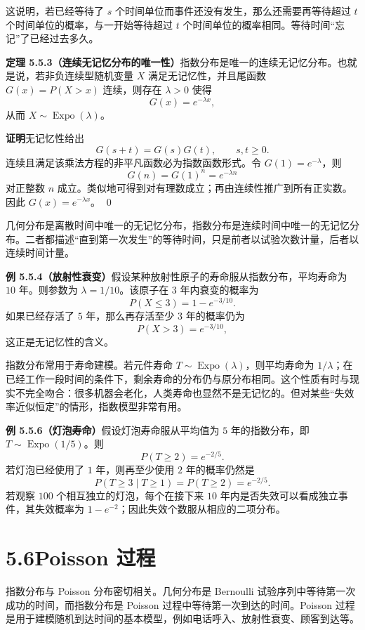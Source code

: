 \documentclass[UTF8, 12pt, fontset=fandol, oneside]{ctexart}
\begin{document}
这说明，若已经等待了 $s$ 个时间单位而事件还没有发生，那么还需要再等待超过 $t$ 个时间单位的概率，与一开始等待超过 $t$ 个时间单位的概率相同。等待时间“忘记”了已经过去多久。

\noindent\textbf{定理 5.5.3（连续无记忆分布的唯一性）}\quad 指数分布是唯一的连续无记忆分布。也就是说，若非负连续型随机变量 $X$ 满足无记忆性，并且尾函数 $G(x)=P(X>x)$ 连续，则存在 $\lambda>0$ 使得
\[
  G(x)=e^{-\lambda x},
\]
从而 $X\sim\operatorname{Expo}(\lambda)$。

\noindent\textbf{证明}\quad 无记忆性给出
\[
  G(s+t)=G(s)G(t),\qquad s,t\ge0.
\]
连续且满足该乘法方程的非平凡函数必为指数函数形式。令 $G(1)=e^{-\lambda}$，则
\[
  G(n)=G(1)^n=e^{-\lambda n}
\]
对正整数 $n$ 成立。类似地可得到对有理数成立；再由连续性推广到所有正实数。因此 $G(x)=e^{-\lambda x}$。
\qed

几何分布是离散时间中唯一的无记忆分布，指数分布是连续时间中唯一的无记忆分布。二者都描述“直到第一次发生”的等待时间，只是前者以试验次数计量，后者以连续时间计量。

\noindent\textbf{例 5.5.4（放射性衰变）}\quad 假设某种放射性原子的寿命服从指数分布，平均寿命为 $10$ 年。则参数为 $\lambda=1/10$。该原子在 $3$ 年内衰变的概率为
\[
  P(X\le3)=1-e^{-3/10}.
\]
如果已经存活了 $5$ 年，那么再存活至少 $3$ 年的概率仍为
\[
  P(X>3)=e^{-3/10},
\]
这正是无记忆性的含义。

指数分布常用于寿命建模。若元件寿命 $T\sim\operatorname{Expo}(\lambda)$，则平均寿命为 $1/\lambda$；在已经工作一段时间的条件下，剩余寿命的分布仍与原分布相同。这个性质有时与现实不完全吻合：很多机器会老化，人类寿命也显然不是无记忆的。但对某些“失效率近似恒定”的情形，指数模型非常有用。

\noindent\textbf{例 5.5.6（灯泡寿命）}\quad 假设灯泡寿命服从平均值为 $5$ 年的指数分布，即 $T\sim\operatorname{Expo}(1/5)$。则
\[
  P(T\ge2)=e^{-2/5}.
\]
若灯泡已经使用了 $1$ 年，则再至少使用 $2$ 年的概率仍然是
\[
  P(T\ge3\mid T\ge1)=P(T\ge2)=e^{-2/5}.
\]
若观察 $100$ 个相互独立的灯泡，每个在接下来 $10$ 年内是否失效可以看成独立事件，其失效概率为 $1-e^{-2}$；因此失效个数服从相应的二项分布。

\section*{5.6\quad Poisson 过程}

指数分布与 Poisson 分布密切相关。几何分布是 Bernoulli 试验序列中等待第一次成功的时间，而指数分布是 Poisson 过程中等待第一次到达的时间。Poisson 过程是用于建模随机到达时间的基本模型，例如电话呼入、放射性衰变、顾客到达等。
\end{document}
